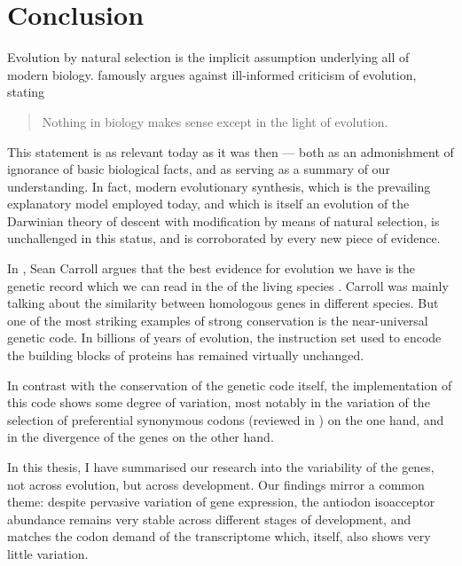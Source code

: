 \chapter{Conclusion}
\label{sec:conclusion}


\noindent
Evolution by natural selection is the implicit assumption underlying all of
modern biology. \citet{Dobzhansky:1973} famously argues against ill-informed
criticism of evolution, stating

\begin{quote}
    Nothing in biology makes sense except in the light of evolution.
\end{quote}

This statement is as relevant today as it was then --- both as an admonishment
of ignorance of basic biological facts, and as serving as a summary of our
understanding. In fact, modern evolutionary synthesis, which is the prevailing
explanatory model employed today, and which is itself an evolution of the
Darwinian theory of descent with modification by means of natural selection, is
unchallenged in this status, and is corroborated by every new piece of evidence.

In , Sean Carroll argues that the best
evidence for evolution we have is the genetic record which we can read in the
\dna of the living species \citep{Carroll:2006}. Carroll was mainly talking
about the similarity between homologous genes in different species. But one of
the most striking examples of strong conservation is the near-universal genetic
code. In billions of years of evolution, the instruction set used to encode the
building blocks of proteins has remained virtually unchanged.

In contrast with the conservation of the genetic code itself, the implementation
of this code shows some degree of variation, most notably in the variation of
the selection of preferential synonymous codons (reviewed in
\citet{Ermolaeva:2001}) on the one hand, and in the divergence of the \trna
genes \citep{Kutter:2011} on the other hand.

In this thesis, I have summarised our research into the variability of the \trna
genes, not across evolution, but across development. Our findings mirror a
common theme: despite pervasive variation of \trna gene expression, the antiodon
isoacceptor \trna abundance remains very stable across different stages of
development, and matches the codon demand of the transcriptome which, itself,
also shows very little variation.

